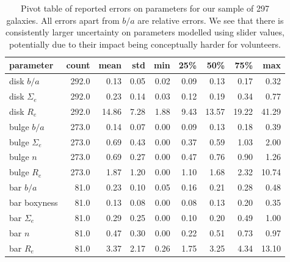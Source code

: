 \documentclass[../main.tex]{subfiles}
\begin{document}
\begin{table}
  \centering
  \caption{Pivot table of reported errors on parameters for our sample of 297 galaxies. All errors apart from $b/a$ are relative errors. We see that there is consistently larger uncertainty on parameters modelled using slider values, potentially due to their impact being conceptually harder for volunteers.}
  \begin{tabular}{l|rrrrrrrr}
  \hline
  parameter &  count &  mean &   std &   min &   25\% &   50\% &   75\% &    max \\
  \hline
  disk $b/a$    &  292.0 &   0.13 &  0.05 &  0.02 &  0.09 &   0.13 &   0.17 &   0.32 \\
  disk $\Sigma_e$ &  292.0 &   0.23 &  0.14 &  0.03 &  0.12 &   0.19 &   0.34 &   0.77 \\
  disk $R_e$    &  292.0 &  14.86 &  7.28 &  1.88 &  9.43 &  13.57 &  19.22 &  41.29 \\
  bulge $b/a$   &  273.0 &   0.14 &  0.07 &  0.00 &  0.09 &   0.13 &   0.18 &   0.39 \\
  bulge $\Sigma_e$ &  273.0 &   0.69 &  0.43 &  0.00 &  0.37 &   0.59 &   1.03 &   2.00 \\
  bulge $n$     &  273.0 &   0.69 &  0.27 &  0.00 &  0.47 &   0.76 &   0.90 &   1.26 \\
  bulge $R_e$   &  273.0 &   1.87 &  1.20 &  0.00 &  1.10 &   1.68 &   2.32 &  10.74 \\
  bar $b/a$     &   81.0 &   0.23 &  0.10 &  0.05 &  0.16 &   0.21 &   0.28 &   0.48 \\
  bar boxyness  &   81.0 &   0.13 &  0.08 &  0.00 &  0.08 &   0.13 &   0.20 &   0.35 \\
  bar $\Sigma_e$ &   81.0 &   0.29 &  0.25 &  0.00 &  0.10 &   0.20 &   0.49 &   1.00 \\
  bar $n$       &   81.0 &   0.47 &  0.30 &  0.00 &  0.22 &   0.51 &   0.73 &   0.97 \\
  bar $R_e$     &   81.0 &   3.37 &  2.17 &  0.26 &  1.75 &   3.25 &   4.34 &  13.10 \\
  \hline
  \end{tabular}
  \label{table:error_values}
\end{table}
\end{document}
